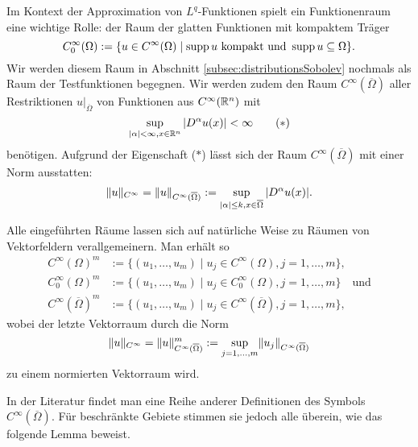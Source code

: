 Im Kontext der Approximation von $L^q$-Funktionen spielt ein Funktionenraum eine wichtige Rolle: der Raum der glatten Funktionen mit kompaktem Träger
$$
C_0^\infty(\Omega) := \{ u \in C^\infty(\Omega) \mid \operatorname{supp} u \text{ kompakt und } \operatorname{supp} u \subseteq \Omega\}.
$$
Wir werden diesem Raum in Abschnitt \ref{subsec:distributionsSobolev} nochmals als Raum der Testfunktionen begegnen.
Wir werden zudem den Raum $C^\infty(\overline\Omega)$ aller Restriktionen $u|_{\overline\Omega}$ von Funktionen aus $C^\infty(\mathbb{R}^n)$ mit
\begin{displaymath}
  \sup_{|\alpha| < \infty, x \in \mathbb{R}^n} |D^\alpha u(x)| < \infty \tag{$\ast$}
\end{displaymath}
benötigen.
Aufgrund der Eigenschaft ($\ast$) lässt sich der Raum $C^\infty(\overline\Omega)$ mit einer Norm ausstatten:
\begin{equation}
  \label{eq:cInftyNorm}
  \lVert u \rVert_{C^\infty} = \lVert u \rVert_{C^\infty(\overline\Omega)} := \sup_{|\alpha|\leq k, x \in \overline\Omega} |D^\alpha u(x)|.
\end{equation}

Alle eingeführten Räume lassen sich auf natürliche Weise zu Räumen von Vektor\-feldern verallgemeinern.
Man erhält so
\begin{align*}
  C^\infty(\Omega)^m &:= \{(u_1,\dots,u_m) \mid u_j \in C^\infty(\Omega), j = 1,\dots,m\}, \\
  C_0^\infty(\Omega)^m &:= \{(u_1,\dots,u_m) \mid u_j \in C_0^\infty(\Omega), j = 1,\dots,m\} \quad\text{und} \\
  C^\infty(\overline\Omega)^m &:= \{(u_1,\dots,u_m) \mid u_j \in C^\infty(\overline\Omega), j = 1,\dots,m\},
\end{align*}
wobei der letzte Vektorraum durch die Norm
$$
\lVert u \rVert_{C^\infty} = \lVert u \rVert_{C^\infty(\overline\Omega)}^m := \sup_{j = 1,\dots, m} \lVert u_j \rVert_{C^\infty(\overline\Omega)}
$$
zu einem normierten Vektorraum wird.

In der Literatur findet man eine Reihe anderer Definitionen des Symbols $C^\infty(\overline\Omega)$.
Für beschränkte Gebiete stimmen sie jedoch alle überein, wie das folgende Lemma beweist.

